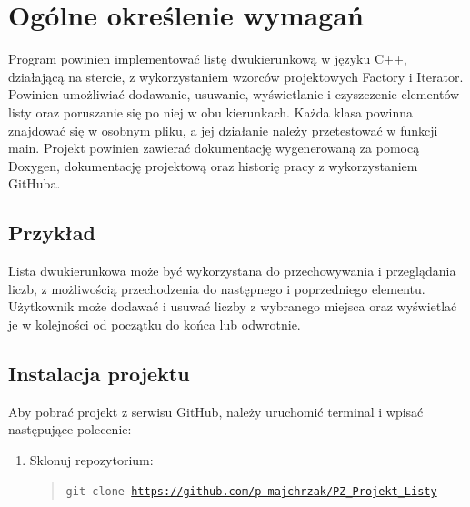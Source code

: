 	\newpage
\section{Ogólne określenie wymagań}		%













\hspace{0.60cm}Program powinien implementować listę dwukierunkową w języku C++, działającą na stercie, z wykorzystaniem wzorców projektowych Factory i Iterator. Powinien umożliwiać dodawanie, usuwanie, wyświetlanie i czyszczenie elementów listy oraz poruszanie się po niej w obu kierunkach. Każda klasa powinna znajdować się w osobnym pliku, a jej działanie należy przetestować w funkcji main. Projekt powinien zawierać dokumentację wygenerowaną za pomocą Doxygen, dokumentację projektową oraz historię pracy z wykorzystaniem GitHuba.

\subsection{Przykład}  %

\hspace{0.60cm}Lista dwukierunkowa może być wykorzystana do przechowywania i przeglądania liczb, z możliwością przechodzenia do następnego i poprzedniego elementu. Użytkownik może dodawać i usuwać liczby z wybranego miejsca oraz wyświetlać je w kolejności od początku do końca lub odwrotnie.


\subsection{Instalacja projektu} %

\vspace{0.3cm} %

Aby pobrać projekt z serwisu GitHub, należy uruchomić terminal i wpisać następujące polecenie:

\begin{enumerate}
    \item Sklonuj repozytorium:
    \begin{quote}
        \texttt{git clone \href{https://github.com/p-majchrzak/PZ_Projekt_Listy.git}{https://github.com/p-majchrzak/PZ_Projekt_Listy}}
    \end{quote}
\end{enumerate}

 
 
 
 
 